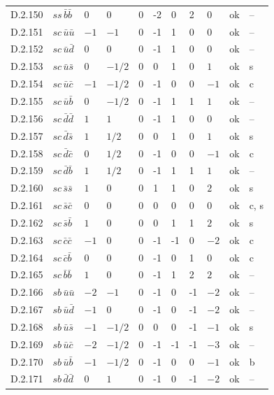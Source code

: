 {\begin{longtable}{@{}llllllllll>{\raggedright\arraybackslash}p{2.0cm}@{}}
D.2.150 & $ss\,\bar{b}\bar{b}$ & $0$ & $0$ & $0$ & -2 & 0 & 2 & $0$ & ok & -- \\
D.2.151 & $sc\,\bar{u}\bar{u}$ & $-1$ & $-1$ & $0$ & -1 & 1 & 0 & $0$ & ok & -- \\
D.2.152 & $sc\,\bar{u}\bar{d}$ & $0$ & $0$ & $0$ & -1 & 1 & 0 & $0$ & ok & -- \\
D.2.153 & $sc\,\bar{u}\bar{s}$ & $0$ & $-1/2$ & $0$ & 0 & 1 & 0 & $1$ & ok & s \\
D.2.154 & $sc\,\bar{u}\bar{c}$ & $-1$ & $-1/2$ & $0$ & -1 & 0 & 0 & $-1$ & ok & c \\
D.2.155 & $sc\,\bar{u}\bar{b}$ & $0$ & $-1/2$ & $0$ & -1 & 1 & 1 & $1$ & ok & -- \\
D.2.156 & $sc\,\bar{d}\bar{d}$ & $1$ & $1$ & $0$ & -1 & 1 & 0 & $0$ & ok & -- \\
D.2.157 & $sc\,\bar{d}\bar{s}$ & $1$ & $1/2$ & $0$ & 0 & 1 & 0 & $1$ & ok & s \\
D.2.158 & $sc\,\bar{d}\bar{c}$ & $0$ & $1/2$ & $0$ & -1 & 0 & 0 & $-1$ & ok & c \\
D.2.159 & $sc\,\bar{d}\bar{b}$ & $1$ & $1/2$ & $0$ & -1 & 1 & 1 & $1$ & ok & -- \\
D.2.160 & $sc\,\bar{s}\bar{s}$ & $1$ & $0$ & $0$ & 1 & 1 & 0 & $2$ & ok & s \\
D.2.161 & $sc\,\bar{s}\bar{c}$ & $0$ & $0$ & $0$ & 0 & 0 & 0 & $0$ & ok & c, s \\
D.2.162 & $sc\,\bar{s}\bar{b}$ & $1$ & $0$ & $0$ & 0 & 1 & 1 & $2$ & ok & s \\
D.2.163 & $sc\,\bar{c}\bar{c}$ & $-1$ & $0$ & $0$ & -1 & -1 & 0 & $-2$ & ok & c \\
D.2.164 & $sc\,\bar{c}\bar{b}$ & $0$ & $0$ & $0$ & -1 & 0 & 1 & $0$ & ok & c \\
D.2.165 & $sc\,\bar{b}\bar{b}$ & $1$ & $0$ & $0$ & -1 & 1 & 2 & $2$ & ok & -- \\
D.2.166 & $sb\,\bar{u}\bar{u}$ & $-2$ & $-1$ & $0$ & -1 & 0 & -1 & $-2$ & ok & -- \\
D.2.167 & $sb\,\bar{u}\bar{d}$ & $-1$ & $0$ & $0$ & -1 & 0 & -1 & $-2$ & ok & -- \\
D.2.168 & $sb\,\bar{u}\bar{s}$ & $-1$ & $-1/2$ & $0$ & 0 & 0 & -1 & $-1$ & ok & s \\
D.2.169 & $sb\,\bar{u}\bar{c}$ & $-2$ & $-1/2$ & $0$ & -1 & -1 & -1 & $-3$ & ok & -- \\
D.2.170 & $sb\,\bar{u}\bar{b}$ & $-1$ & $-1/2$ & $0$ & -1 & 0 & 0 & $-1$ & ok & b \\
D.2.171 & $sb\,\bar{d}\bar{d}$ & $0$ & $1$ & $0$ & -1 & 0 & -1 & $-2$ & ok & -- \\

\end{longtable}}
